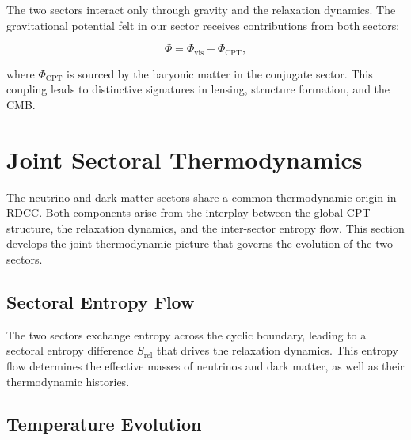 \documentclass[11pt,a4paper]{article}
\begin{document}
The two sectors interact only through gravity and the relaxation dynamics. The
gravitational potential felt in our sector receives contributions from both
sectors:


\[
\Phi = \Phi_{\mathrm{vis}} + \Phi_{\mathrm{CPT}},
\]


where $\Phi_{\mathrm{CPT}}$ is sourced by the baryonic matter in the conjugate
sector. This coupling leads to distinctive signatures in lensing, structure
formation, and the CMB.




\section{Joint Sectoral Thermodynamics}

The neutrino and dark matter sectors share a common thermodynamic origin in
RDCC. Both components arise from the interplay between the global CPT
structure, the relaxation dynamics, and the inter-sector entropy flow. This
section develops the joint thermodynamic picture that governs the evolution of
the two sectors.




\subsection{Sectoral Entropy Flow}

The two sectors exchange entropy across the cyclic boundary, leading to a
sectoral entropy difference $S_{\mathrm{rel}}$ that drives the relaxation
dynamics. This entropy flow determines the effective masses of neutrinos and
dark matter, as well as their thermodynamic histories.




\subsection{Temperature Evolution}
\end{document}
